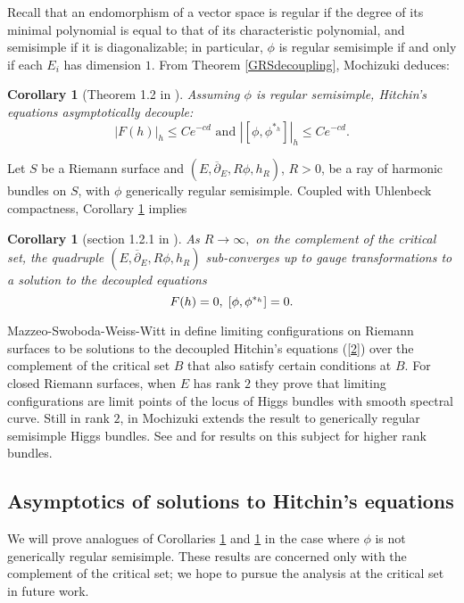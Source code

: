 \documentclass[10pt]{amsart}
\newtheorem{cor}[thm]{Corollary}
\theoremstyle{definition}
\begin{document}
Recall that an endomorphism of a vector space is regular if the degree of its minimal polynomial is equal to that of its characteristic polynomial, and semisimple if it is diagonalizable; in particular, $\phi$ is regular semisimple if and only if each $E_i$ has dimension $1$. From Theorem \ref{GRSdecoupling}, Mochizuki deduces:
\begin{cor}[Theorem 1.2 in \cite{Mo}]\label{GRSasympdecoupling}
Assuming $\phi$ is regular semisimple, Hitchin's equations asymptotically decouple:
\begin{equation*}
    |F(h)|_{h} \leq Ce^{-cd} \textrm{ and } |[\phi,\phi^{*_{h}}]|_{h} \leq Ce^{-cd}.
\end{equation*}
\end{cor}
Let $S$ be a Riemann surface and $(E,\overline{\partial}_E,R\phi,h_R)$, $R>0$, be a ray of harmonic bundles on $S$, with $\phi$ generically regular semisimple. Coupled with Uhlenbeck compactness, Corollary \ref{GRSasympdecoupling} implies 

\begin{cor} [section 1.2.1 in \cite{Mo}] \label{cor:GRSlimit} As $R\to\infty,$ on the complement of the critical set, the quadruple $(E,\overline{\partial}_E,R\phi,h_R)$ sub-converges up to gauge transformations to a solution to the decoupled equations \begin{equation}\label{2}
   F(h)=0, \hspace{1mm} [\phi,\phi^{*_h}]=0.
\end{equation}
\end{cor}

Mazzeo-Swoboda-Weiss-Witt in \cite{MSWW} define limiting configurations on Riemann surfaces to be solutions to the decoupled Hitchin's equations (\ref{2}) over the complement of the critical set $B$ that also satisfy certain conditions at $B$. For closed Riemann surfaces, when $E$ has rank $2$ they prove that limiting configurations are limit points of the locus of Higgs bundles with smooth spectral curve. Still in rank $2$, in \cite{Mo} Mochizuki extends the result to generically regular semisimple Higgs bundles. See \cite{Fre} and \cite{MSz} for results on this subject for higher rank bundles.

\subsection{Asymptotics of solutions to Hitchin's equations}

We will prove analogues of Corollaries \ref{GRSasympdecoupling} and \ref{cor:GRSlimit} in the case where $\phi$ is not generically regular semisimple. These results are concerned only with the complement of the critical set; we hope to pursue the analysis at the critical set in future work.
\end{document}
